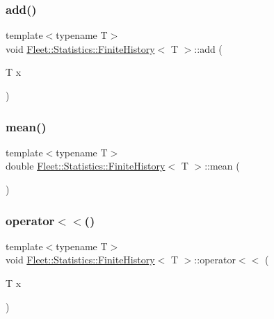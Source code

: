 \subsubsection{\texorpdfstring{add()}{add()}}
{\footnotesize\ttfamily template$<$typename T$>$ \\
void \hyperlink{class_fleet_1_1_statistics_1_1_finite_history}{Fleet\+::\+Statistics\+::\+Finite\+History}$<$ T $>$\+::add (\begin{DoxyParamCaption}\item[{T}]{x }\end{DoxyParamCaption})\hspace{0.3cm}{\ttfamily [inline]}}

\mbox{\label{class_fleet_1_1_statistics_1_1_finite_history_a7ece3121889428a4082fbe88fdacc106}} 
\subsubsection{\texorpdfstring{mean()}{mean()}}
{\footnotesize\ttfamily template$<$typename T$>$ \\
double \hyperlink{class_fleet_1_1_statistics_1_1_finite_history}{Fleet\+::\+Statistics\+::\+Finite\+History}$<$ T $>$\+::mean (\begin{DoxyParamCaption}{ }\end{DoxyParamCaption})\hspace{0.3cm}{\ttfamily [inline]}}

\mbox{\label{class_fleet_1_1_statistics_1_1_finite_history_acee6a049c14cb100dca992444b84d9ec}} 
\subsubsection{\texorpdfstring{operator$<$$<$()}{operator<<()}}
{\footnotesize\ttfamily template$<$typename T$>$ \\
void \hyperlink{class_fleet_1_1_statistics_1_1_finite_history}{Fleet\+::\+Statistics\+::\+Finite\+History}$<$ T $>$\+::operator$<$$<$ (\begin{DoxyParamCaption}\item[{T}]{x }\end{DoxyParamCaption})\hspace{0.3cm}{\ttfamily [inline]}}

